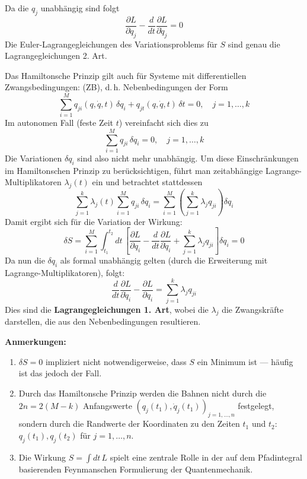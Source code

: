 \documentclass[10pt, letterpaper]{article}
\begin{document}
Da die $q_j$ unabhängig sind folgt 
$$\frac{\partial L}{\partial q_j} - \frac{d}{dt}\frac{\partial L}{\partial \dot{q}_j} = 0$$
Die Euler-Lagrangegleichungen des Variationsproblems für $S$ sind genau die Lagrangegleichungen 2. Art.

Das Hamiltonsche Prinzip gilt auch für Systeme mit differentiellen Zwangsbedingungen: (ZB), d.\,h. Nebenbedingungen der Form
\[
\sum_{i=1}^M q_{ji}(q,\dot{q},t)\, \delta q_i + q_{jt}(q,\dot{q},t)\, \delta t = 0, \quad j = 1,\dots,k
\]
Im autonomen Fall (feste Zeit $t$) vereinfacht sich dies zu
\[
\sum_{i=1}^M q_{ji}\, \delta q_i = 0, \quad j=1,\dots,k
\]
Die Variationen $\delta q_i$ sind also nicht mehr unabhängig. Um diese Einschränkungen im Hamiltonschen Prinzip zu berücksichtigen, führt man zeitabhängige Lagrange-Multiplikatoren $\lambda_j(t)$ ein und betrachtet stattdessen
\[
\sum_{j=1}^k \lambda_j(t) \sum_{i=1}^M q_{ji}\, \delta q_i = \sum_{i=1}^M \left( \sum_{j=1}^k \lambda_j q_{ji} \right)\delta q_i
\]
Damit ergibt sich für die Variation der Wirkung:
\[
\delta S = \sum_{i=1}^M \int_{t_1}^{t_2} dt\, \left[ \frac{\partial L}{\partial q_i} - \frac{d}{dt} \frac{\partial L}{\partial \dot{q}_i} + \sum_{j=1}^k \lambda_j q_{ji} \right] \delta q_i = 0
\]
Da nun die $\delta q_i$ als formal unabhängig gelten (durch die Erweiterung mit Lagrange-Multiplikatoren), folgt:
\[
\frac{d}{dt} \frac{\partial L}{\partial \dot{q}_i} - \frac{\partial L}{\partial q_i} = \sum_{j=1}^k \lambda_j q_{ji}
\]
Dies sind die \textbf{Lagrangegleichungen 1. Art}, wobei die $\lambda_j$ die Zwangskräfte darstellen, die aus den Nebenbedingungen resultieren.





\textbf{Anmerkungen:}

\begin{enumerate}
    \item $\delta S = 0$ impliziert nicht notwendigerweise, dass $S$ ein Minimum ist — häufig ist das jedoch der Fall.
    
    \item Durch das Hamiltonsche Prinzip werden die Bahnen nicht durch die $2n = 2(M - k)$ Anfangswerte $(q_j(t_1), \dot{q}_j(t_1))_{j=1,\dots,n}$ festgelegt, sondern durch die Randwerte der Koordinaten zu den Zeiten $t_1$ und $t_2$: $q_j(t_1), q_j(t_2)$ für $j = 1,\dots,n$.
    
    \item Die Wirkung $S = \int dt\, L$ spielt eine zentrale Rolle in der auf dem Pfadintegral basierenden Feynmanschen Formulierung der Quantenmechanik.
\end{enumerate}
\end{document}
